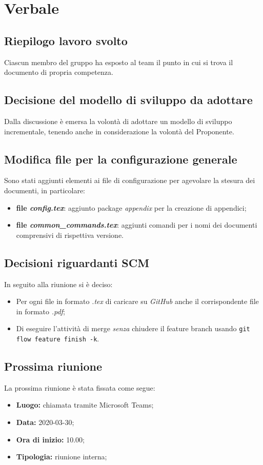 \section{Verbale}
	
	\subsection{Riepilogo lavoro svolto}
		Ciascun membro del gruppo ha esposto al team il punto in cui si trova il documento di propria competenza.
		
	\subsection{Decisione del modello di sviluppo da adottare}
	Dalla discussione è emersa la volontà di adottare un modello di sviluppo incrementale, tenendo anche in considerazione la volontà del Proponente.
	
	\subsection{Modifica file per la configurazione generale}
	Sono stati aggiunti elementi ai file di configurazione per agevolare la stesura dei documenti, in particolare:
	\begin{itemize}
		\item{\textbf{file \textit{config.tex}}: aggiunto package \textit{appendix} per la creazione di appendici;}
		\item{\textbf{file \textit{common\_commands.tex}}: aggiunti comandi per i nomi dei documenti comprensivi di rispettiva versione.}
	\end{itemize}
	
	\subsection{Decisioni riguardanti SCM}
	In seguito alla riunione si è deciso:
	\begin{itemize}
		\item{Per ogni file in formato \textit{.tex} di caricare su \textit{GitHub} anche il corrispondente file in formato \textit{.pdf};}
		\item{Di eseguire l'attività di merge \textit{senza} chiudere il feature branch usando \texttt{git flow feature finish -k}.}
	\end{itemize}
		
	\subsection{Prossima riunione}
		La prossima riunione è stata fissata come segue: 
		\begin{itemize}
			\item \textbf{Luogo: } chiamata tramite Microsoft Teams; 
			\item \textbf{Data: } 2020-03-30; 
			\item \textbf{Ora di inizio: } 10.00;
			\item \textbf{Tipologia: } riunione interna;
		\end{itemize}
